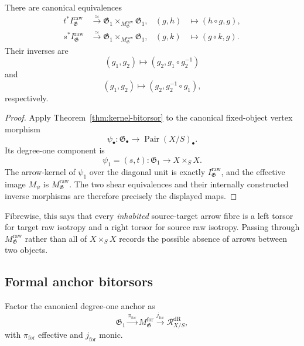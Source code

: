 \begin{theorem}
\label{thm:raw-bitorsor}
There are canonical equivalences
\[
\begin{aligned}
    t^*I^{\mathrm{raw}}_{\mathfrak G}
    &\xrightarrow{\simeq}
    \mathfrak G_1
    \times_{M^{\mathrm{raw}}_{\mathfrak G}}
    \mathfrak G_1,
    &
    (g,h)&\longmapsto(h\circ g,g),\\
    s^*I^{\mathrm{raw}}_{\mathfrak G}
    &\xrightarrow{\simeq}
    \mathfrak G_1
    \times_{M^{\mathrm{raw}}_{\mathfrak G}}
    \mathfrak G_1,
    &
    (g,k)&\longmapsto(g\circ k,g).
\end{aligned}
\]
Their inverses are
\[
    (g_1,g_2)
    \longmapsto
    (g_2,g_1\circ g_2^{-1})
\]
and
\[
    (g_1,g_2)
    \longmapsto
    (g_2,g_2^{-1}\circ g_1),
\]
respectively.
\end{theorem}

\begin{proof}
Apply Theorem~\ref{thm:kernel-bitorsor} to the canonical fixed-object vertex
morphism
\[
    \psi_\bullet:
    \mathfrak G_\bullet
    \longrightarrow
    \operatorname{Pair}(X/S)_\bullet.
\]
Its degree-one component is
\[
    \psi_1=(s,t):
    \mathfrak G_1\longrightarrow X\times_SX.
\]
The arrow-kernel of $\psi_1$ over the diagonal unit is exactly
$I^{\mathrm{raw}}_{\mathfrak G}$, and the effective image
$M_\psi$ is $M^{\mathrm{raw}}_{\mathfrak G}$.  The two shear equivalences and
their internally constructed inverse morphisms are therefore precisely the
displayed maps.
\end{proof}

\begin{remark}
Fibrewise, this says that every \emph{inhabited} source-target arrow fibre is
a left torsor for target raw isotropy and a right torsor for source raw
isotropy.  Passing through
$M^{\mathrm{raw}}_{\mathfrak G}$ rather than all of $X\times_SX$ records the
possible absence of arrows between two objects.
\end{remark}

\subsection{Formal anchor bitorsors}

Factor the canonical degree-one anchor as
\[
    \mathfrak G_1
    \xrightarrow{\pi_{\mathrm{for}}}
    M^{\mathrm{for}}_{\mathfrak G}
    \xrightarrow{j_{\mathrm{for}}}
    \mathcal R^{\mathrm{dR}}_{X/S},
\]
with $\pi_{\mathrm{for}}$ effective and $j_{\mathrm{for}}$ monic.

